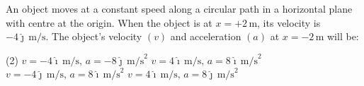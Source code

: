 \item An object moves at a constant speed along a circular path in a horizontal plane with centre at the origin. When the object is at $x = +2 \, \text{m}$, its velocity is $-4\hat{\jmath} \, \text{m/s}$. The object's velocity $(v)$ and acceleration $(a)$ at $x = -2 \, \text{m}$ will be:
    \begin{tasks}(2)
        \task $v = -4\hat{\imath} \, \text{m/s}, \, a = -8\hat{\jmath} \, \text{m/s}^2$
        \task $v = 4\hat{\imath} \, \text{m/s}, \, a = 8\hat{\imath} \, \text{m/s}^2$
        \task $v = -4\hat{\jmath} \, \text{m/s}, \, a = 8\hat{\imath} \, \text{m/s}^2$
        \task $v = 4\hat{\imath} \, \text{m/s}, \, a = 8\hat{\jmath} \, \text{m/s}^2$
    \end{tasks}